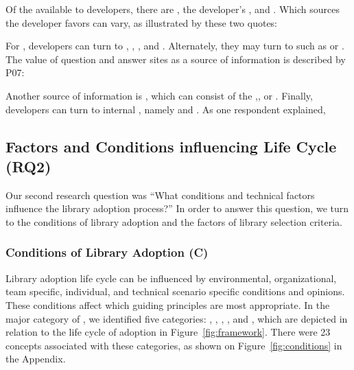 Of the  available to developers, there are , the developer's , and . Which sources the developer favors can vary, as illustrated by these two quotes:

For , developers can turn to , , , and . Alternately, they may turn to  such as  or . The value of question and answer sites as a source of information is described by P07:

Another source of information is , which can consist of the ,, or . Finally, developers can turn to internal , namely  and . As one respondent explained,


\subsection{Factors and Conditions influencing Life Cycle (RQ2)}

Our second research question was ``What conditions and technical factors influence the library adoption process?'' In order to answer this question, we turn to the conditions of library adoption and the factors of library selection criteria.

\subsubsection{Conditions of Library Adoption (C)}\label{sec:conditions}
Library adoption life cycle can be influenced by environmental, organizational, team specific, individual, and technical scenario specific conditions and opinions. These conditions affect which guiding principles are most appropriate. In the major category of , we identified five categories: , , , , and , which are depicted in relation to the life cycle of adoption in Figure~\ref{fig:framework}. There were 23 concepts associated with these categories, as shown on Figure~\ref{fig:conditions} in the Appendix.

